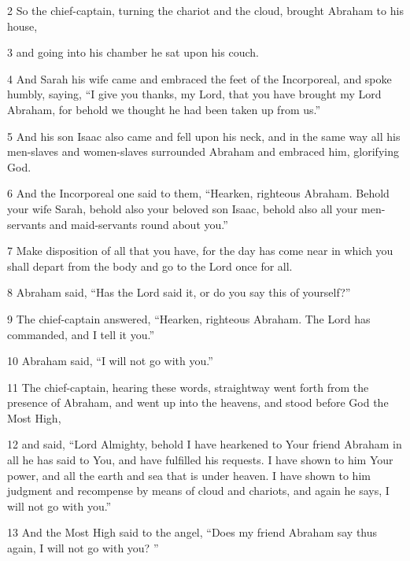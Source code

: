 \par 2 So the chief-captain, turning the chariot and the cloud, brought Abraham to his house, 

\par 3 and going into his chamber he sat upon his couch. 

\par 4 And Sarah his wife came and embraced the feet of the Incorporeal, and spoke humbly, saying, “I give you thanks, my Lord, that you have brought my Lord Abraham, for behold we thought he had been taken up from us.” 

\par 5 And his son Isaac also came and fell upon his neck, and in the same way all his men-slaves and women-slaves surrounded Abraham and embraced him, glorifying God. 

\par 6 And the Incorporeal one said to them, “Hearken, righteous Abraham. Behold your wife Sarah, behold also your beloved son Isaac, behold also all your men-servants and maid-servants round about you.” 

\par 7 Make disposition of all that you have, for the day has come near in which you shall depart from the body and go to the Lord once for all. 

\par 8 Abraham said, “Has the Lord said it, or do you say this of yourself?” 

\par 9 The chief-captain answered, “Hearken, righteous Abraham. The Lord has commanded, and I tell it you.” 

\par 10 Abraham said, “I will not go with you.” 

\par 11 The chief-captain, hearing these words, straightway went forth from the presence of Abraham, and went up into the heavens, and stood before God the Most High, 

\par 12 and said, “Lord Almighty, behold I have hearkened to Your friend Abraham in all he has said to You, and have fulfilled his requests. I have shown to him Your power, and all the earth and sea that is under heaven. I have shown to him judgment and recompense by means of cloud and chariots, and again he says, I will not go with you.” 

\par 13 And the Most High said to the angel, “Does my friend Abraham say thus again, I will not go with you? ”

